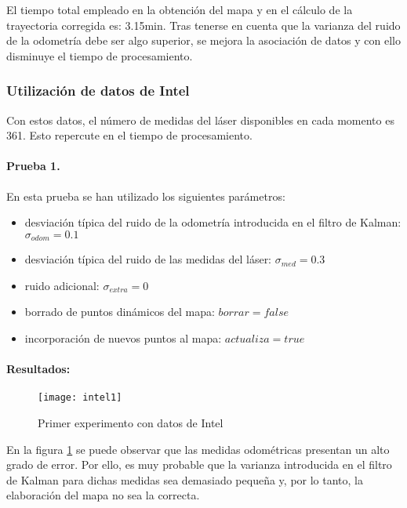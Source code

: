 El tiempo total empleado en la obtención del mapa y en el cálculo de la trayectoria corregida es: 3.15min. Tras tenerse en cuenta que la varianza del ruido de la odometría debe ser algo superior, se mejora la asociación de datos y con ello disminuye el tiempo de procesamiento.

\clearpage
\subsubsection{Utilización de datos de Intel}

Con estos datos, el número de medidas del láser disponibles en cada momento es 361. Esto repercute en el tiempo de procesamiento.

\paragraph{Prueba 1.}
En esta prueba se han utilizado los siguientes parámetros:
\begin{itemize}
  \item desviación típica del ruido de la odometría introducida en el filtro de Kalman: $\sigma_{odom} = 0.1$
  \item desviación típica del ruido de las medidas del láser: $\sigma_{med} = 0.3$
  \item ruido adicional: $\sigma_{extra} = 0$
  \item borrado de puntos dinámicos del mapa: $borrar = false$
  \item incorporación de nuevos puntos al mapa: $actualiza = true$
\end{itemize}


\paragraph{Resultados:}

\begin{figure}[h]
  \centering\texttt{[image: intel1]}\\
  \caption{Primer experimento con datos de Intel}\label{fg:intel1}
\end{figure}

En la figura \ref{fg:intel1} se puede observar que las medidas odométricas presentan un alto grado de error. Por ello, es muy probable que la varianza introducida en el filtro de Kalman para dichas medidas sea demasiado pequeña y, por lo tanto, la elaboración del mapa no sea la correcta.

